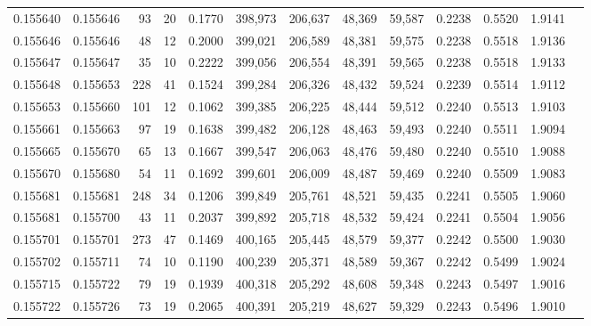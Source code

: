 \begin{tabular}{rrrrrrrrrrrrr}
0.155640 & 0.155646 &    93 &  20 &                                     0.1770 & 398,973 & 206,637 &  48,369 &  59,587 & 0.2238 & 0.5520 & 1.9141 \\
0.155646 & 0.155646 &    48 &  12 &                                     0.2000 & 399,021 & 206,589 &  48,381 &  59,575 & 0.2238 & 0.5518 & 1.9136 \\
0.155647 & 0.155647 &    35 &  10 &                                     0.2222 & 399,056 & 206,554 &  48,391 &  59,565 & 0.2238 & 0.5518 & 1.9133 \\
0.155648 & 0.155653 &   228 &  41 &                                     0.1524 & 399,284 & 206,326 &  48,432 &  59,524 & 0.2239 & 0.5514 & 1.9112 \\
0.155653 & 0.155660 &   101 &  12 &                                     0.1062 & 399,385 & 206,225 &  48,444 &  59,512 & 0.2240 & 0.5513 & 1.9103 \\
0.155661 & 0.155663 &    97 &  19 &                                     0.1638 & 399,482 & 206,128 &  48,463 &  59,493 & 0.2240 & 0.5511 & 1.9094 \\
0.155665 & 0.155670 &    65 &  13 &                                     0.1667 & 399,547 & 206,063 &  48,476 &  59,480 & 0.2240 & 0.5510 & 1.9088 \\
0.155670 & 0.155680 &    54 &  11 &                                     0.1692 & 399,601 & 206,009 &  48,487 &  59,469 & 0.2240 & 0.5509 & 1.9083 \\
0.155681 & 0.155681 &   248 &  34 &                                     0.1206 & 399,849 & 205,761 &  48,521 &  59,435 & 0.2241 & 0.5505 & 1.9060 \\
0.155681 & 0.155700 &    43 &  11 &                                     0.2037 & 399,892 & 205,718 &  48,532 &  59,424 & 0.2241 & 0.5504 & 1.9056 \\
0.155701 & 0.155701 &   273 &  47 &                                     0.1469 & 400,165 & 205,445 &  48,579 &  59,377 & 0.2242 & 0.5500 & 1.9030 \\
0.155702 & 0.155711 &    74 &  10 &                                     0.1190 & 400,239 & 205,371 &  48,589 &  59,367 & 0.2242 & 0.5499 & 1.9024 \\
0.155715 & 0.155722 &    79 &  19 &                                     0.1939 & 400,318 & 205,292 &  48,608 &  59,348 & 0.2243 & 0.5497 & 1.9016 \\
0.155722 & 0.155726 &    73 &  19 &                                     0.2065 & 400,391 & 205,219 &  48,627 &  59,329 & 0.2243 & 0.5496 & 1.9010 \\

\end{tabular}
